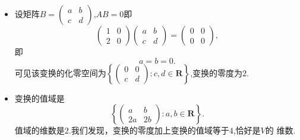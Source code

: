 ﻿\documentclass{book} \usepackage{exsheets} \usepackage{xeCJK}
\begin{document}
\begin{solution}
  \begin{itemize}
  \item 设矩阵$B=
    \begin{pmatrix}
      a&b\\
c&d
    \end{pmatrix}
$,$AB=0$即
$$
\begin{pmatrix}
  1&0\\
2&0
\end{pmatrix}
\begin{pmatrix}
  a&b\\
c&d
\end{pmatrix}=
\begin{pmatrix}
  0&0\\
0&0
\end{pmatrix},
$$
即
$$
a=b=0.
$$
可见该变换的化零空间为$\left\{
  \begin{pmatrix}
    0&0\\
c&d
  \end{pmatrix}:c,d\in \mathbf{R}
\right\}$,变换的零度为$2$.
\item 变换的值域是
$$
\left\{
  \begin{pmatrix}
    a&b\\
2a&2b
  \end{pmatrix}:a,b\in \mathbf{R}
\right\}.
$$
值域的维数是$2$.我们发现，变换的零度加上变换的值域等于$4$,恰好是$V$的
维数.
  \end{itemize}
\end{solution}
\end{document}
